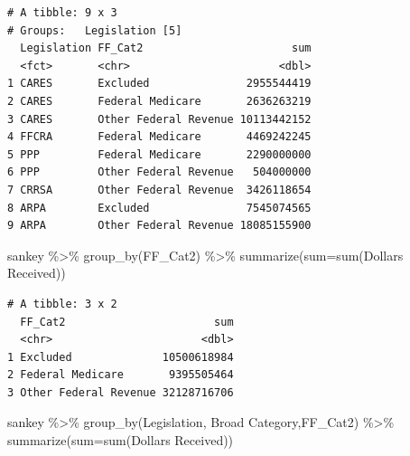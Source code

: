 \documentclass[
  letterpaper,
  DIV=11,
  numbers=noendperiod]{scrreport}
\newenvironment{Shaded}{\begin{snugshade}}{\end{snugshade}}
\newcommand{\AttributeTok}[1]{\textcolor[rgb]{0.40,0.45,0.13}{#1}}
\newcommand{\FunctionTok}[1]{\textcolor[rgb]{0.28,0.35,0.67}{#1}}
\newcommand{\NormalTok}[1]{\textcolor[rgb]{0.00,0.23,0.31}{#1}}
\newcommand{\SpecialCharTok}[1]{\textcolor[rgb]{0.37,0.37,0.37}{#1}}
\newcommand{\StringTok}[1]{\textcolor[rgb]{0.13,0.47,0.30}{#1}}
\begin{document}
\begin{verbatim}
# A tibble: 9 x 3
# Groups:   Legislation [5]
  Legislation FF_Cat2                       sum
  <fct>       <chr>                       <dbl>
1 CARES       Excluded               2955544419
2 CARES       Federal Medicare       2636263219
3 CARES       Other Federal Revenue 10113442152
4 FFCRA       Federal Medicare       4469242245
5 PPP         Federal Medicare       2290000000
6 PPP         Other Federal Revenue   504000000
7 CRRSA       Other Federal Revenue  3426118654
8 ARPA        Excluded               7545074565
9 ARPA        Other Federal Revenue 18085155900
\end{verbatim}

\begin{Shaded}
\begin{Highlighting}[]
\NormalTok{sankey }\SpecialCharTok{\%\textgreater{}\%} 
  \FunctionTok{group\_by}\NormalTok{(FF\_Cat2) }\SpecialCharTok{\%\textgreater{}\%} 
  \FunctionTok{summarize}\NormalTok{(}\AttributeTok{sum=}\FunctionTok{sum}\NormalTok{(}\StringTok{\textasciigrave{}}\AttributeTok{Dollars Received}\StringTok{\textasciigrave{}}\NormalTok{))}
\end{Highlighting}
\end{Shaded}

\begin{verbatim}
# A tibble: 3 x 2
  FF_Cat2                       sum
  <chr>                       <dbl>
1 Excluded              10500618984
2 Federal Medicare       9395505464
3 Other Federal Revenue 32128716706
\end{verbatim}

\begin{Shaded}
\begin{Highlighting}[]
\NormalTok{sankey }\SpecialCharTok{\%\textgreater{}\%} 
  \FunctionTok{group\_by}\NormalTok{(Legislation, }\StringTok{\textasciigrave{}}\AttributeTok{Broad Category}\StringTok{\textasciigrave{}}\NormalTok{,FF\_Cat2) }\SpecialCharTok{\%\textgreater{}\%} 
  \FunctionTok{summarize}\NormalTok{(}\AttributeTok{sum=}\FunctionTok{sum}\NormalTok{(}\StringTok{\textasciigrave{}}\AttributeTok{Dollars Received}\StringTok{\textasciigrave{}}\NormalTok{))}
\end{Highlighting}
\end{Shaded}
\end{document}
